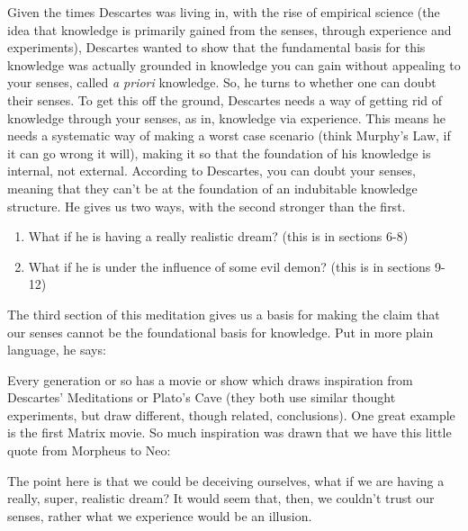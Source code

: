Given the times Descartes was living in, with the rise of empirical science (the idea that knowledge is primarily gained from the senses, through experience and experiments), Descartes wanted to show that the fundamental basis for this knowledge was actually grounded in knowledge you can gain without appealing to your senses, called \emph{a priori} knowledge. So, he turns to whether one can doubt their senses. To get this off the ground, Descartes needs a way of getting rid of knowledge through your senses, as in, knowledge via experience. This means he needs a systematic way of making a worst case scenario (think Murphy's Law, if it can go wrong it will), making it so that the foundation of his knowledge is internal, not external.  According to Descartes, you can doubt your senses, meaning that they can't be at the foundation of an indubitable knowledge structure. He gives us two ways, with the second stronger than the first.
\begin{enumerate}
    \item What if he is having a really realistic dream? (this is in sections 6-8)
    \item What if he is under the influence of some evil demon? (this is in sections 9-12)
\end{enumerate}
The third section of this meditation gives us a basis for making the claim that our senses cannot be the foundational basis for knowledge. Put in more plain language, he says:


Every generation or so has a movie or show which draws inspiration from Descartes' Meditations or Plato's Cave (they both use similar thought experiments, but draw different, though related, conclusions). One great example is the first Matrix movie. So much inspiration was drawn that we have this little quote from Morpheus to Neo:


The point here is that we could be deceiving ourselves, what if we are having a really, super, realistic dream? It would seem that, then, we couldn't trust our senses, rather what we experience would be an illusion.


